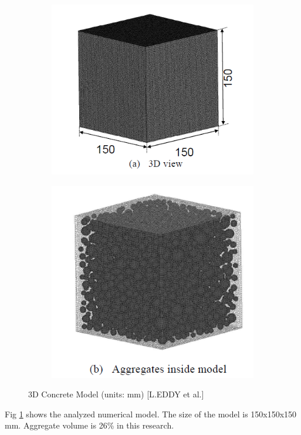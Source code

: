\begin{itemize}
    \begin{figure}[ht!]
    \centering
    \begin{subfigure}{.5\textwidth}
      \centering
      \includegraphics[width=.9\linewidth]{Files/Background/EDDY_model_1.png}
    \end{subfigure}%
    \begin{subfigure}{.5\textwidth}
      \centering
      \includegraphics[width=.75\linewidth]{Files/Background/EDDY_model_2.png}
    \end{subfigure}
    \caption{3D Concrete Model (units: mm) [L.EDDY et al.]}
    \label{fig:EDDY_model}
    \end{figure}

    Fig \ref{fig:EDDY_model} shows the analyzed numerical model. The size of the model is 150x150x150 mm. Aggregate volume is 26\% in this research.


\end{itemize}
